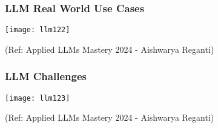 \begin{frame}[fragile]\frametitle{LLM Real World Use Cases}

\begin{center}
\texttt{[image: llm122]}
\end{center}				

{\tiny (Ref: Applied LLMs Mastery 2024 - Aishwarya Reganti)}

\end{frame}

\begin{frame}[fragile]\frametitle{LLM Challenges}

\begin{center}
\texttt{[image: llm123]}
\end{center}				

{\tiny (Ref: Applied LLMs Mastery 2024 - Aishwarya Reganti)}

\end{frame}




				

